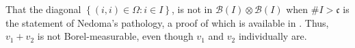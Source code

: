 \documentclass{article}
\numberwithin{theorem}{section}
\newtheorem{lemma}{Lemma}
\numberwithin{lemma}{section}
\numberwithin{definition}{section}
\numberwithin{assumption}{section}
\numberwithin{proposition}{section}
\numberwithin{remark}{section}
\numberwithin{corollary}{section}
\numberwithin{conjecture}{section}
\numberwithin{example}{section}
\newcommand{\N}{\mathbb{N}}
\newcommand{\bset}[1]{\left \lbrace #1 \right \rbrace}
\newcommand{\aset}[1]{\left \langle #1 \right \rangle}
\newcommand{\Span}[1]{\mathrm{Span}\bset{#1}}
\begin{document}
\begin{multicols*}{2}
    That the diagonal $ \bset{(i, i) \in \Omega: i \in I}$, is not in $\mathscr B(I) \otimes \mathscr B(I)$ when $\# I > \mathfrak c$ is the statement of Nedoma's pathology, a proof of which is available in \cite{schechter1996}. Thus, $v_1 + v_2$ is not Borel-measurable, even though $v_1$ and $v_2$ individually are. 

\end{multicols*}
\end{document}
